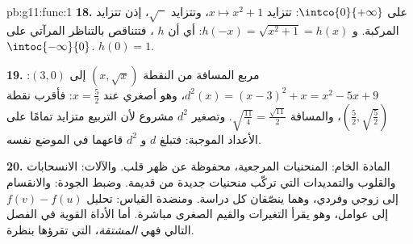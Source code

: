 \begin{solution}{pb:g11:func:1}
\textbf{18.} على $\intco{0}{+\infty}$: تتزايد $x \mapsto x^2 + 1$،
وتتزايد $\sqrt{\phantom{x}}$، إذن تتزايد
 المركبة. و $h(-x) = \sqrt{x^2 + 1} = h(x)$: أي أن $h$
، فتتناقص بالتناظر المرآتي على
$\intoc{-\infty}{0}$.  $h(0) = 1$.

\textbf{19.} مربع المسافة من النقطة $(x, \sqrt x)$ إلى $(3, 0)$:
$d^2(x) = (x - 3)^2 + x = x^2 - 5x + 9$، وهو أصغري عند
$x = \frac52$: فأقرب نقطة
$\left(\frac52, \sqrt{\frac52}\right)$، والمسافة
$\sqrt{\frac{11}{4}} = \frac{\sqrt{11}}{2}$. وتصغير $d^2$
مشروع لأن التربيع متزايد تمامًا على
الأعداد الموجبة: فتبلغ $d$ و $d^2$ قاعهما في الموضع نفسه.

\textbf{20.} المادة الخام: المنحنيات المرجعية، محفوظة عن ظهر قلب.
والآلات: الانسحابات والقلوب والتمديدات التي تركّب منحنيات جديدة
من قديمة. وضبط الجودة:  والانقسام إلى زوجي وفردي،
وهما ينصّفان كل دراسة. ومنضدة القياس: تحليل
$f(v) - f(u)$ إلى عوامل، وهو يقرأ التغيرات والقيم الصغرى مباشرة. أما
الأداة القوية في الفصل التالي فهي \emph{المشتقة}، التي تقرؤها
بنظرة.
\end{solution}
